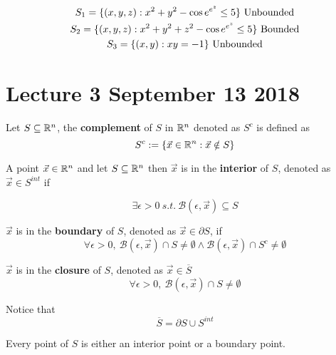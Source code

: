 \documentclass[]{article}
\newcommand{\ball}[2]{\mathcal{B}({#1}, {#2})}
\begin{document}
		\begin{example}
			\begin{gather*}
				S_1 = \{(x,y,z): x^2 + y^2 - \cos{e^{e^z}} \leq 5\} \text{{ Unbounded}}\\
				S_2 = \{(x,y,z): x^2 + y^2 + z^2 - \cos{e^{e^z}} \leq 5\} \text{{ Bounded}}\\
				S_3 = \{(x,y): xy=-1\} \text{{ Unbounded}} \\
			\end{gather*}
		\end{example}
	\section{Lecture 3 September 13 2018}
	
	\begin{definition}
		Let $S \subseteq \mathbb{R}^n$, the \textbf{complement} of $S$ in $\mathbb{R}^n$ denoted as $S^c$ is defined as 
		\[
			S^c:= \{\vec{x} \in \mathbb{R}^n: \vec{x} \notin S\}
		\]
	\end{definition}
	
	\begin{definition}
		A point $\vec{x} \in \mathbb{R}^n$ and let $S \subseteq \mathbb{R}^n$ then $\vec{x}$ is in the \textbf{interior} of $S$, denoted as $\vec{x} \in S^{int}$ if
		
		\[
			\exists \epsilon > 0 \ s.t.\ \ball{\epsilon}{\vec{x}} \subseteq S
		\]
	\end{definition}
	
	\begin{definition}
		$\vec{x}$ is in the \textbf{boundary} of $S$, denoted as $\vec{x} \in \partial S$, if 
		\[
			\forall \epsilon > 0,\ 
			\ball{\epsilon}{\vec{x}} \cap S \neq \emptyset 
			\land 
			\ball{\epsilon}{\vec{x}} \cap S^c \neq \emptyset
		\]
	\end{definition}
	
	\begin{definition}
		$\vec{x}$ is in the \textbf{closure} of $S$, denoted as $\vec{x} \in \overline{S}$
		\[
			\forall \epsilon > 0,\ \ball{\epsilon}{\vec{x}} \cap S \neq \emptyset
		\]
	\end{definition}

	\begin{theorem}
		Notice that 
		\[
			\overline{S} = \partial S \cup S^{int}
		\]
	\end{theorem}
	
	\begin{remark}
		Every point of $S$ is either an interior point or a boundary point.
	\end{remark}
	
\end{document}
